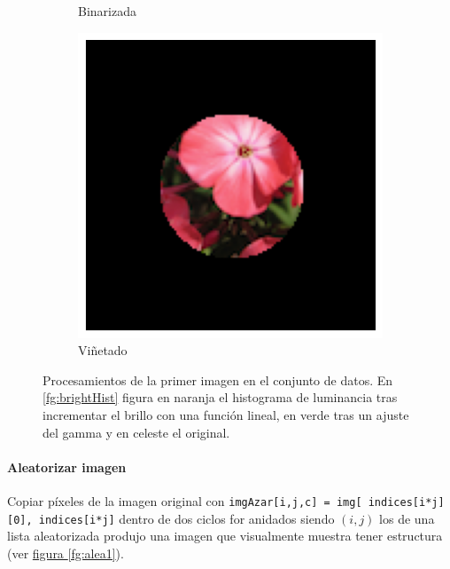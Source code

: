 \documentclass{article}
\begin{document}
\begin{figure}
\begin{subfigure}[b]{0.24\textwidth}
		\caption{Binarizada}
		\label{fg:imgGrau0binarizada}
	\end{subfigure}
	\begin{subfigure}[b]{0.24\textwidth}
		\includegraphics[width= \textwidth]{circle}
		\caption{Viñetado}
		\label{fg:circle}
	\end{subfigure}
	\caption{Procesamientos de la primer imagen en el conjunto de datos. En \hyperref[fg:brightHist]{\ref*{fg:brightHist}} figura en naranja el histograma de luminancia tras incrementar el brillo con una función lineal, en verde tras un ajuste del gamma y en celeste el original.}	
\end{figure}




\paragraph{Aleatorizar imagen} 
Copiar píxeles de la imagen original con \verb'imgAzar[i,j,c] = img[ indices[i*j][0], indices[i*j]' dentro de dos ciclos for anidados siendo \((i,j)\) los de una lista aleatorizada produjo una imagen que visualmente muestra tener estructura (ver \hyperref[fg:alea1]{figura \ref*{fg:alea1}}).
\end{document}

